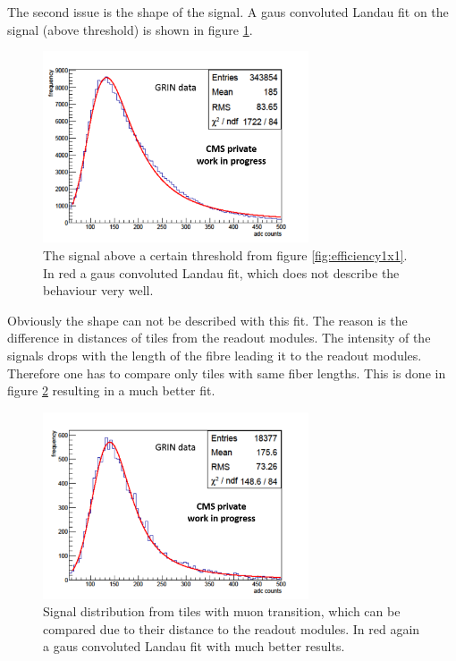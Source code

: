 			The second issue is the shape of the signal.
			A gaus convoluted Landau fit on the signal (above threshold) is shown in figure \ref{fig:langaus_bad}.
			\begin{figure}[htbp]
				\centering
				\includegraphics[width=0.70\textwidth]{Figures/erdogan/langaus_bad.png}
				\caption{The signal above a certain threshold from figure \ref{fig:efficiency1x1}. In red a gaus convoluted Landau fit, which does not describe the behaviour very well.}
				\label{fig:langaus_bad}
			\end{figure}
			Obviously the shape can not be described with this fit.
			The reason is the difference in distances of tiles from the readout modules.
			The intensity of the signals drops with the length of the fibre leading it to the readout modules.
			Therefore one has to compare only tiles with same fiber lengths.
			This is done in figure \ref{fig:langaus_good} resulting in a much better fit.
			\begin{figure}[htbp]
				\centering
				\includegraphics[width=0.70\textwidth]{Figures/erdogan/langaus_good.png}
				\caption{Signal distribution from tiles with muon transition, which can be compared due to their distance to the readout modules. In red again a gaus convoluted Landau fit with much better
				results.}
				\label{fig:langaus_good}
			\end{figure}
